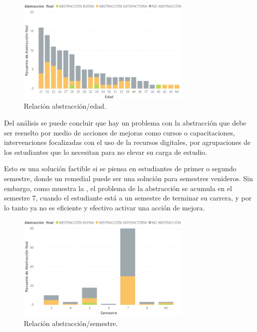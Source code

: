 \documentclass[spanish]{textolivre}
\begin{document}
\begin{figure}[htbp]
 \centering
 \includegraphics[width=0.75\textwidth]{figura5.png}
 \caption{Relación abstracción/edad.}
 \label{figura 5}
\end{figure}

Del análisis se puede concluir que hay un problema con la abstracción que debe ser resuelto por medio de acciones de mejoras como cursos o capacitaciones, intervenciones focalizadas con el uso de la recursos digitales, por agrupaciones de los estudiantes que lo necesitan para no elevar su carga de estudio.

Esto es una solución factible si se piensa en estudiantes de primer o segundo semestre, donde un remedial puede ser una solución para semestres venideros. Sin embargo, como muestra la , el problema de la abstracción se acumula en el semestre 7, cuando el estudiante está a un semestre de terminar su carrera, y por lo tanto ya no es eficiente y efectivo activar una acción de mejora.

\begin{figure}[htbp]
 \centering
 \includegraphics[width=0.75\textwidth]{figura6.png}
 \caption{Relación abstracción/semestre.}
 \label{figura 6}
\end{figure}
\end{document}
